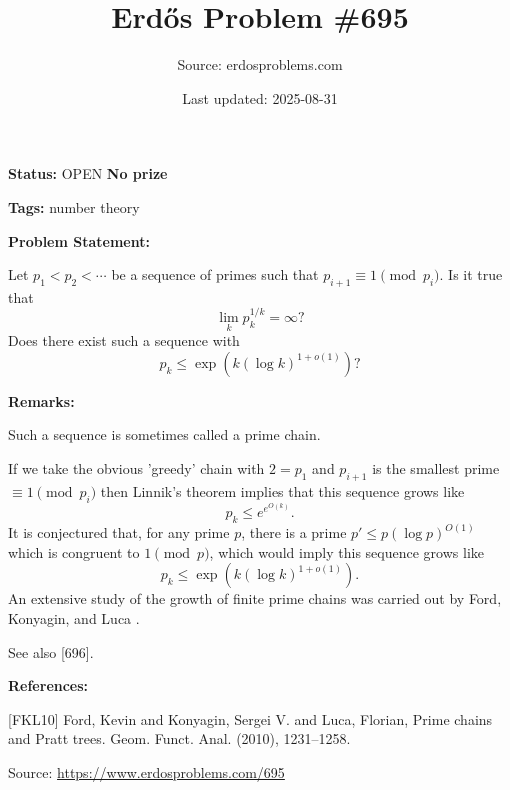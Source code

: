 \documentclass{article}
\title{Erd\H{o}s Problem \#695}
\date{Last updated: 2025-08-31}
\author{Source: erdosproblems.com}
\begin{document}
\maketitle

\noindent\textbf{Status:} OPEN \quad \textbf{No prize}

\noindent\textbf{Tags:} number theory

\medskip
\noindent\textbf{Problem Statement:}

Let $p_1<p_2<\cdots$ be a sequence of primes such that $p_{i+1}\equiv 1\pmod{p_i}$. Is it true that\[\lim_k p_k^{1/k}=\infty?\]Does there exist such a sequence with\[p_k \leq \exp(k(\log k)^{1+o(1)})?\]

\bigskip
\noindent\textbf{Remarks:}

Such a sequence is sometimes called a prime chain. 

If we take the obvious 'greedy' chain with $2=p_1$ and $p_{i+1}$ is the smallest prime $\equiv 1\pmod{p_i}$ then Linnik's theorem implies that this sequence grows like\[p_k \leq e^{e^{O(k)}}.\]It is conjectured that, for any prime $p$, there is a prime $p'\leq p(\log p)^{O(1)}$ which is congruent to $1\pmod{p}$, which would imply this sequence grows like\[p_k\leq \exp(k(\log k)^{1+o(1)}).\]An extensive study of the growth of finite prime chains was carried out by Ford, Konyagin, and Luca \cite{FKL10}.

See also [696].

\bigskip
\noindent\textbf{References:}

[FKL10] Ford, Kevin and Konyagin, Sergei V. and Luca, Florian, Prime chains and {P}ratt trees. Geom. Funct. Anal. (2010), 1231--1258.

\bigskip
\noindent\small{Source: \url{https://www.erdosproblems.com/695}}
\end{document}

